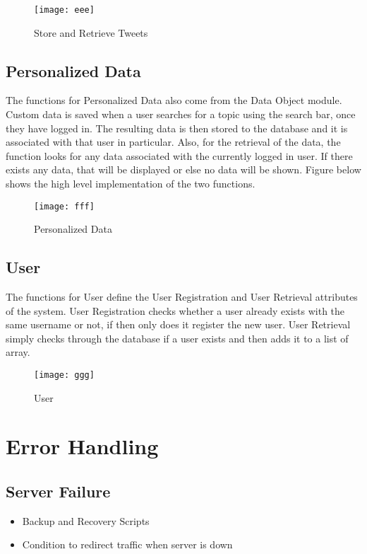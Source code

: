 \documentclass[12pt, titlepage]{article}
\begin{document}
\begin{figure}[H]
\centering
\texttt{[image: eee]}
\caption{Store and Retrieve Tweets}
\label{fig:Alchemy}
\end{figure}

\subsection{Personalized Data}
The functions for Personalized Data also come from the Data Object module. Custom data is saved when a user searches for a topic using the search bar, once they have logged in. The resulting data is then stored to the database and it is associated with that user in particular. Also, for the retrieval of the data, the function looks for any data associated with the currently logged in user. If there exists any data, that will be displayed or else no data will be shown. Figure below shows the high level implementation of the two functions. 

\begin{figure}[H]
\centering
\texttt{[image: fff]}
\caption{Personalized Data}
\label{fig:Alchemy}
\end{figure}

\subsection{User}
The functions for User define the User Registration and User Retrieval attributes of the system. User Registration checks whether a user already exists with the same username or not, if then only does it register the new user. User Retrieval simply checks through the database if a user exists and then adds it to a list of array. 

\begin{figure}[H]
\centering
\texttt{[image: ggg]}
\caption{User}
\label{fig:Alchemy}
\end{figure}


\section{Error Handling}
\subsection{Server Failure}
\begin{itemize}
\item Backup and Recovery Scripts
\item Condition to redirect traffic when server is down
\end{itemize}
\end{document}
